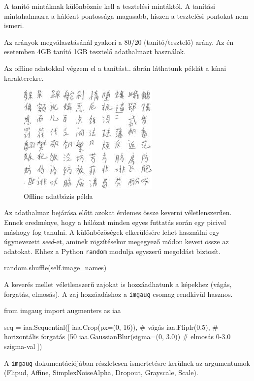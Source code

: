 A tanító mintáknak különböznie kell a tesztelési mintáktól. A tanítási mintahalmazra a hálózat pontossága magasabb, hiszen a tesztelési pontokat nem ismeri.

Az arányok megválasztásánál gyakori a 80/20 (tanító/tesztelő) arány. Az én esetemben 4GB tanító 1GB tesztelő adathalmazt használok.

Az offline adatokkal végzem el a tanítást.. ábrán láthatunk példát a kínai karakterekre.

\begin{figure}[h]
	\centering
	\includegraphics[scale=2.0]{images/offline_dataset}
	\caption{Offline adatbázis példa}
	\label{fig:offline_dataset}
\end{figure} 

Az adathalmaz bejárása előtt azokat érdemes össze keverni véletlenszerűen. Ennek eredménye, hogy a hálózat minden egyes futtatás során egy picivel máshogy fog tanulni. A különbözöségek elkerülésére lehet használni egy úgynevezett \textit{seed}-et, aminek rögzítésekor megegyező módon keveri össze az adatokat. Ehhez a Python \texttt{random} modulja egyszerű megoldást biztosít.
\begin{python}
random.shuffle(self.image_names)
\end{python}

A keverés mellet véletlenszerű zajokat is hozzáadhatunk a képekhez (vágás, forgatás, elmosás). A zaj hozzáadáshoz a \texttt{imgaug} csomag rendkivül hasznos.

\begin{python}
from imgaug import augmenters as iaa

seq = iaa.Sequential([
    iaa.Crop(px=(0, 16)), # vágás 
    iaa.Fliplr(0.5), # horizontális forgatás (50%
    iaa.GaussianBlur(sigma=(0, 3.0)) # elmosás 0-3.0 szigma-val
])
\end{python}

A \texttt{imgaug} dokumentációjában részletesen ismertetésre kerülnek az argumentumok (Flipud, Affine, SimplexNoiseAlpha, Dropout, Grayscale, Scale).

